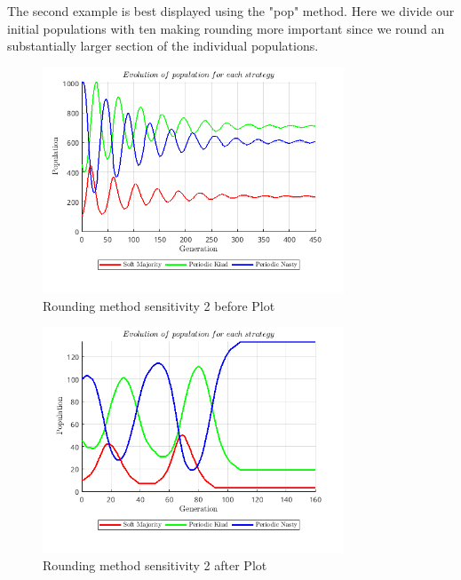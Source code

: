 The second example is best displayed using the "pop" method. Here we divide our initial populations with ten making rounding more important since we round an substantially larger section of the individual populations.
\begin{figure}[H]
    \centering
    \includegraphics[width=0.8\textwidth]{media/meetings/rounding_method_sensitivity_2_before_pop.png}
    \caption{Rounding method sensitivity 2 before Plot}
\end{figure}
\begin{figure}[H]
    \centering
    \includegraphics[width=0.8\textwidth]{media/meetings/rounding_method_sensitivity_2_after_pop.png}
    \caption{Rounding method sensitivity 2 after Plot}
\end{figure}

